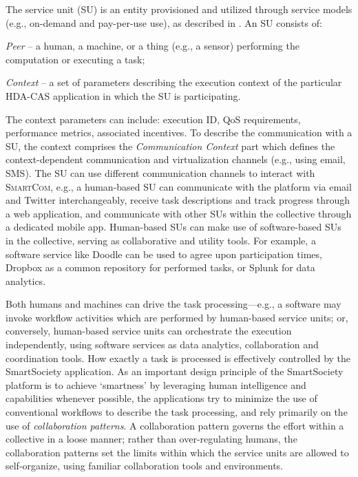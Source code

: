 \documentclass{llncs}
\newcommand{\mdl}{\textsc{SmartCom}}
\begin{document}
      The service unit (SU) is an entity provisioned and utilized through service models (e.g., on-demand and pay-per-use use), as described in \cite{truongijcis}. An SU consists of:
        \begin{inparaenum}[\itshape i)]
          \item \textit{Peer} -- a human, a machine, or a thing (e.g., a sensor) performing the computation or executing a task;
          \item \textit{Context} -- a set of parameters describing the execution context of the particular HDA-CAS application in which the SU is participating. 
        \end{inparaenum}
      The context parameters can include: execution ID, QoS requirements, performance metrics, associated incentives. 
	  To describe the communication with a SU, the context comprises the \emph{Communication Context} part which defines the context-dependent communication and virtualization channels (e.g., using email, SMS).
      The SU can use different communication channels to interact with \mdl{}, e.g., a human-based SU can communicate with the platform via email and Twitter interchangeably, receive task descriptions and track progress through a web application, and communicate with other SUs within the collective through a dedicated mobile app. Human-based SUs can make use of software-based SUs in the collective, serving as collaborative and utility tools. For example, a software service like Doodle can be used to agree upon participation times, Dropbox as a common repository for performed tasks, or Splunk for data analytics.

      Both humans and machines can drive the task processing---e.g., a software may invoke workflow activities which are performed by  human-based service units; or, conversely, human-based service units can orchestrate the execution independently, using software services as data analytics, collaboration and coordination tools.
      How exactly a task is processed is effectively controlled by the SmartSociety application.  As an important design principle of the SmartSociety platform is to achieve `smartness' by leveraging human intelligence and capabilities whenever possible, the applications try to minimize the use of conventional workflows to describe the task processing, and rely primarily on the use of \emph{collaboration patterns}. 
      A collaboration pattern governs the effort within a collective in a loose manner; rather than over-regulating humans, the collaboration patterns set the limits within which the service units are allowed to self-organize, using familiar collaboration tools and environments. 
      
\end{document}

